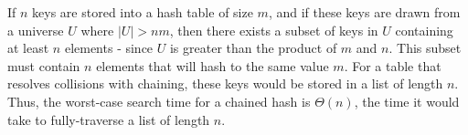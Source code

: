 If $ n $ keys are stored into a hash table of size $ m $, and if these keys are drawn from a universe $ U $ where $ \mid U \mid > nm $, then there exists a subset of keys in $ U $ containing at least $ n $ elements - since $ U $ is greater than the product of $ m $ and $ n $. This subset must contain $ n $ elements that will hash to the same value $ m $. For a table that resolves collisions with chaining, these keys would be stored in a list of length $ n $. Thus, the worst-case search time for a chained hash is $ \Theta(n) $, the time it would take to fully-traverse a list of length $ n $.